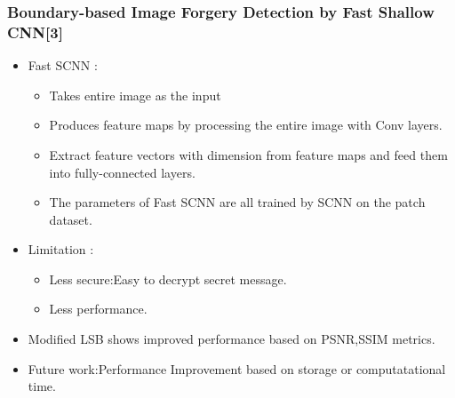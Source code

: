 \documentclass{beamer} %
\theoremstyle{definition} %
\begin{document}
\begin{frame}
 \frametitle{Boundary-based Image Forgery Detection by Fast Shallow CNN[3] }
 \begin{itemize}
       \item{Fast SCNN :}
       \begin{itemize}
       	\item Takes entire image as the input  
       	\item Produces feature maps by processing the entire image
			with Conv layers.
		\item Extract feature vectors with dimension from feature maps and feed them into fully-connected layers. 
		\item The parameters of Fast SCNN are all trained by SCNN on
			the patch dataset.
		\end{itemize}
	\end{itemize}
\begin{itemize}
	\item{Limitation :}
	\begin{itemize}
		\item {Less secure:Easy to decrypt secret message. }
		\item {Less performance.  }
	\end{itemize}
	\item{Modified LSB shows improved performance based on PSNR,SSIM metrics.} 
	\item{Future work:Performance Improvement based on storage or computatational time.}
\end{itemize}
\end{frame}
\end{document}
